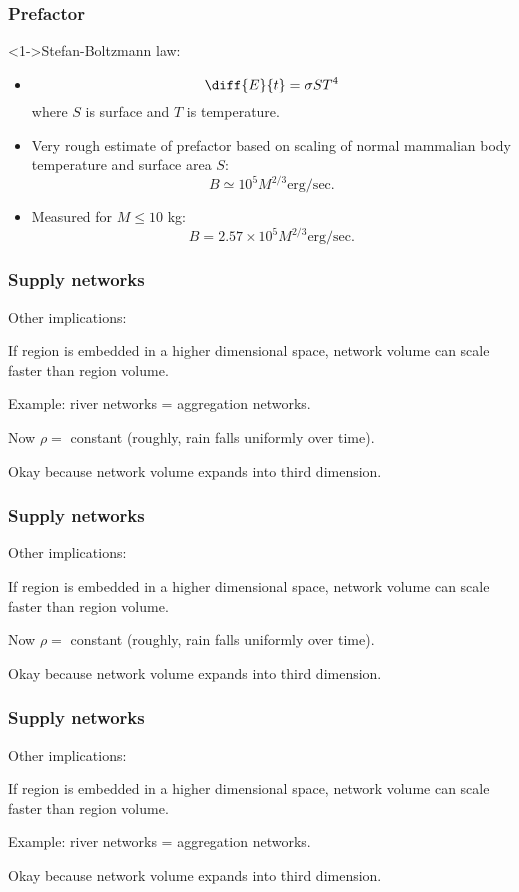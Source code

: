 \begin{frame}
  \frametitle{Prefactor}

  \begin{block}<1->{Stefan-Boltzmann law:}
    \begin{itemize}
    \item<1->
      $$\diff{E}{t} = \sigma S T^4$$
      where $S$ is surface and $T$ is temperature.
    \item<2-> 
      Very rough estimate of prefactor based on scaling
      of normal mammalian body temperature and surface
      area $S$:
      $$B \simeq 10^5M^{2/3} \mbox{erg/sec}.$$
    \item<3->
      Measured for $M \leq 10$ kg:
      $$B=2.57\times 10^5M^{2/3} \mbox{erg/sec}.$$
    \end{itemize}
  \end{block}

\end{frame}

\begin{frame}
  \frametitle{Supply networks}

Other implications:

If region is embedded in a higher dimensional space,
network volume can scale faster than region volume.

\inv

Example: river networks = aggregation networks.

Now $\rho =$ constant (roughly, rain falls uniformly over time).

Okay because network volume expands into third dimension.

\end{frame}

\begin{frame}
  \frametitle{Supply networks}

Other implications:

If region is embedded in a higher dimensional space,
network volume can scale faster than region volume.


\inv

Now $\rho =$ constant (roughly, rain falls uniformly over time).

Okay because network volume expands into third dimension.

\end{frame}

\begin{frame}
  \frametitle{Supply networks}

Other implications:

If region is embedded in a higher dimensional space,
network volume can scale faster than region volume.

Example: river networks = aggregation networks.


\inv

Okay because network volume expands into third dimension.

\end{frame}

